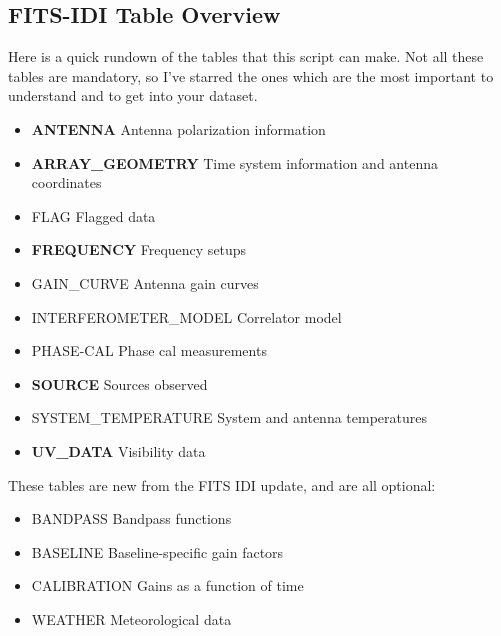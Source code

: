 \documentclass[letterpaper,10pt,english]{sphinxmanual}
\begin{document}
\subsection{FITS-IDI Table Overview}
\label{index:fits-idi-table-overview}
Here is a quick rundown of the tables that this script can make.
Not all these tables are mandatory, so I've starred the ones which are the most
important to understand and to get into your dataset.
\begin{itemize}
\item {} 
\textbf{ANTENNA}           Antenna polarization information

\item {} 
\textbf{ARRAY\_GEOMETRY}    Time system information and antenna coordinates

\item {} 
FLAG                  Flagged data

\item {} 
\textbf{FREQUENCY}         Frequency setups

\item {} 
GAIN\_CURVE            Antenna gain curves

\item {} 
INTERFEROMETER\_MODEL  Correlator model

\item {} 
PHASE-CAL             Phase cal measurements

\item {} 
\textbf{SOURCE}            Sources observed

\item {} 
SYSTEM\_TEMPERATURE    System and antenna temperatures

\item {} 
\textbf{UV\_DATA}           Visibility data

\end{itemize}

These tables are new from the FITS IDI update, and are all optional:
\begin{itemize}
\item {} 
BANDPASS              Bandpass functions

\item {} 
BASELINE              Baseline-specific gain factors

\item {} 
CALIBRATION           Gains as a function of time

\item {} 
WEATHER               Meteorological data

\end{itemize}
\end{document}
